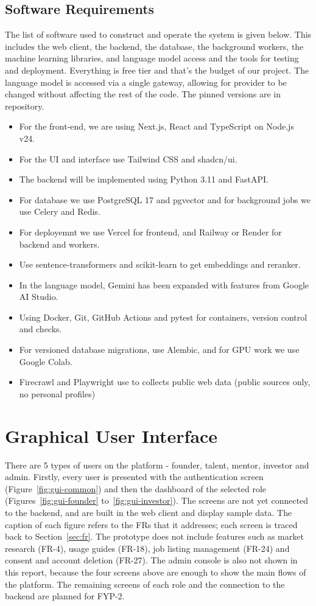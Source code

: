 \documentclass{FastFyp}
\begin{document}
\subsection{Software Requirements}
The list of software used to construct and operate the system is given below. This includes the web client, the backend, the database, the background workers, the machine learning libraries, and language model access and the tools for testing and deployment. Everything is free tier and that's the budget of our project. The language model is accessed via a single gateway, allowing for provider to be changed without affecting the rest of the code. The pinned versions are in repository.
\begin{itemize}
\item For the front-end, we are using Next.js, React and TypeScript on Node.js v24.
\item For the UI and interface use Tailwind CSS and shadcn/ui.
\item The backend will be implemented using Python 3.11 and FastAPI.
\item For database we use PostgreSQL 17 and pgvector and for background jobs we use Celery and Redis.
\item For deployemnt we use Vercel for frontend, and Railway or Render for backend and workers.
\item Use sentence-transformers and scikit-learn to get embeddings and reranker.
\item In the language model, Gemini has been expanded with features from Google AI Studio.
\item Using Docker, Git, GitHub Actions and pytest for containers, version control and checks.
\item For versioned database migrations, use Alembic, and for GPU work we use Google Colab.
\item Firecrawl and Playwright use to collects public web data (public sources only, no personal profiles)
\end{itemize}


\section{Graphical User Interface}\label{sec:gui}
There are 5 types of users on the platform - founder, talent, mentor, investor and admin. Firstly, every user is presented with the authentication screen (Figure~\ref{fig:gui-common}) and then the dashboard of the selected role (Figures~\ref{fig:gui-founder} to~\ref{fig:gui-investor}). The screens are not yet connected to the backend, and are built in the web client and display sample data. The caption of each figure refers to the FRs that it addresses; each screen is traced back to Section~\ref{sec:fr}. The prototype does not include features such as market research (FR-4), usage guides (FR-18), job listing management (FR-24) and consent and account deletion (FR-27). The admin console is also not shown in this report, because the four screens above are enough to show the main flows of the platform. The remaining screens of each role and the connection to the backend are planned for FYP-2.
\end{document}
